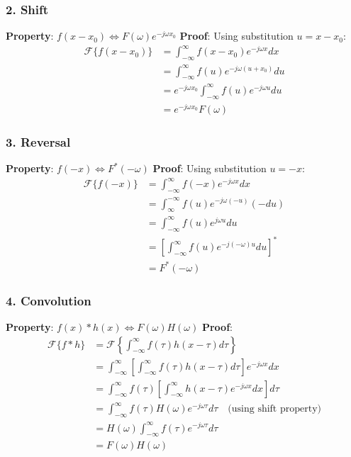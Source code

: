 \documentclass[12pt,a4paper]{article}
\begin{document}
\subsubsection*{2. Shift}
\textbf{Property}: $f(x - x_0) \Leftrightarrow F(\omega)e^{-j\omega x_0}$
\newline
\textbf{Proof}: Using substitution $u = x - x_0$:
\begin{align*}
\mathcal{F}\{f(x-x_0)\} &= \int_{-\infty}^{\infty} f(x-x_0)e^{-j\omega x}dx\\
&= \int_{-\infty}^{\infty} f(u)e^{-j\omega (u+x_0)}du\\
&= e^{-j\omega x_0}\int_{-\infty}^{\infty} f(u)e^{-j\omega u}du\\
&= e^{-j\omega x_0}F(\omega)
\end{align*}

\subsubsection*{3. Reversal}
\textbf{Property}: $f(-x) \Leftrightarrow F^*(-\omega)$
\newline
\textbf{Proof}: Using substitution $u = -x$:
\begin{align*}
\mathcal{F}\{f(-x)\} &= \int_{-\infty}^{\infty} f(-x)e^{-j\omega x}dx\\
&= \int_{\infty}^{-\infty} f(u)e^{-j\omega (-u)}(-du)\\
&= \int_{-\infty}^{\infty} f(u)e^{j\omega u}du\\
&= \left[\int_{-\infty}^{\infty} f(u)e^{-j(-\omega) u}du\right]^*\\
&= F^*(-\omega)
\end{align*}

\subsubsection*{4. Convolution}
\textbf{Property}: $f(x) * h(x) \Leftrightarrow F(\omega)H(\omega)$
\newline
\textbf{Proof}:
\begin{align*}
\mathcal{F}\{f * h\} &= \mathcal{F}\left\{\int_{-\infty}^{\infty} f(\tau)h(x-\tau)d\tau\right\}\\
&= \int_{-\infty}^{\infty} \left[\int_{-\infty}^{\infty} f(\tau)h(x-\tau)d\tau\right]e^{-j\omega x}dx\\
&= \int_{-\infty}^{\infty} f(\tau)\left[\int_{-\infty}^{\infty} h(x-\tau)e^{-j\omega x}dx\right]d\tau\\
&= \int_{-\infty}^{\infty} f(\tau)H(\omega)e^{-j\omega \tau}d\tau \quad \text{(using shift property)}\\
&= H(\omega)\int_{-\infty}^{\infty} f(\tau)e^{-j\omega \tau}d\tau\\
&= F(\omega)H(\omega)
\end{align*}
\end{document}
